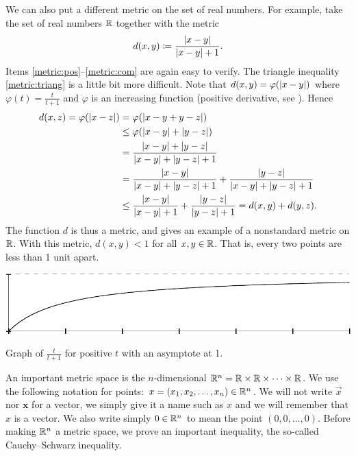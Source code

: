 \begin{example}
We can also put a different metric on the set of real numbers.
For example, take the set of real numbers ${\mathbb{R}}$ together with the metric
\begin{equation*}
d(x,y) \coloneqq
\frac{\left\lvert {x-y} \right\rvert}{\left\lvert {x-y} \right\rvert+1} .
\end{equation*}
Items \ref{metric:pos}--\ref{metric:com} are again easy to verify.  The
triangle inequality \ref{metric:triang} is a little bit more difficult.
Note that $d(x,y) = \varphi(\left\lvert {x-y} \right\rvert)$ where $\varphi(t) =
\frac{t}{t+1}$ and $\varphi$ is an increasing function
(positive derivative, see ).
Hence
\begin{equation*}
\begin{split}
d(x,z) = \varphi(\left\lvert {x-z} \right\rvert)
& = 
\varphi(\left\lvert {x-y+y-z} \right\rvert) \\
& \leq
\varphi(\left\lvert {x-y} \right\rvert+\left\lvert {y-z} \right\rvert)
\\
& =
\frac{\left\lvert {x-y} \right\rvert+\left\lvert {y-z} \right\rvert}{\left\lvert {x-y} \right\rvert+\left\lvert {y-z} \right\rvert+1} \\
& =
\frac{\left\lvert {x-y} \right\rvert}{\left\lvert {x-y} \right\rvert+\left\lvert {y-z} \right\rvert+1} +
\frac{\left\lvert {y-z} \right\rvert}{\left\lvert {x-y} \right\rvert+\left\lvert {y-z} \right\rvert+1}
\\
& \leq
\frac{\left\lvert {x-y} \right\rvert}{\left\lvert {x-y} \right\rvert+1} +
\frac{\left\lvert {y-z} \right\rvert}{\left\lvert {y-z} \right\rvert+1} =
d(x,y)+ d(y,z) .
\end{split}
\end{equation*}
The function $d$ is thus a metric, and gives
an example of a nonstandard metric on ${\mathbb{R}}$.  With this metric,
$d(x,y) < 1$ for all $x,y \in {\mathbb{R}}$.  That is,
every two points are less than 1 unit apart.
\begin{myfigureht}
\includegraphics{figures/tovertp1graph}
\caption{Graph of $\frac{t}{t+1}$ for positive $t$ with an asymptote at 1.\label{fig:tovertp1}}
\end{myfigureht}
\end{example}

An important metric space is the
$n$-dimensional \emph{}
${\mathbb{R}}^n = {\mathbb{R}} \times {\mathbb{R}} \times \cdots \times {\mathbb{R}}$.   We use the following
notation for points: $x =(x_1,x_2,\ldots,x_n) \in {\mathbb{R}}^n$.  We will not write
$\vec{x}$ nor $\mathbf{x}$ for a vector, we simply give it a name such as
$x$ and we will remember that $x$ is a vector.
We also
write simply $0 \in {\mathbb{R}}^n$ to mean the point $(0,0,\ldots,0)$.  Before
making ${\mathbb{R}}^n$ a metric space, we prove an important inequality, the
so-called Cauchy--Schwarz inequality.

